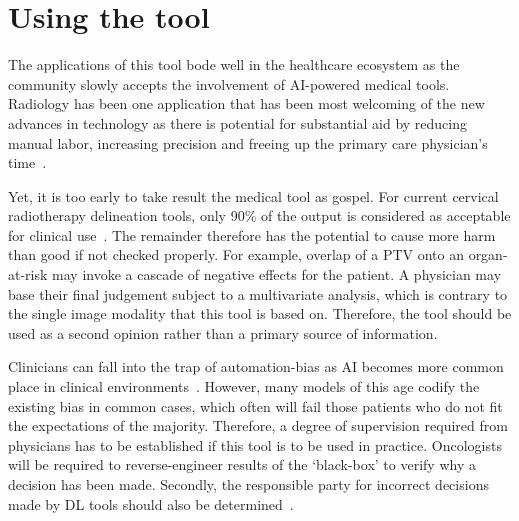 \documentclass[12pt,twoside]{report}
\begin{document}
\section{Using the tool}\label{sect:using-the-tool}

The applications of this tool bode well in the healthcare ecosystem as the community slowly accepts the involvement of AI-powered medical tools. Radiology has been one application that has been most welcoming of the new advances in technology as there is potential for substantial aid by reducing manual labor, increasing precision and freeing up the primary care physician's time~\cite{Amisha2019-ki}.

Yet, it is too early to take result the medical tool as gospel. For current cervical radiotherapy delineation tools, only 90\% of the output is considered as acceptable for clinical use~\cite{LIU2020172}. The remainder therefore has the potential to cause more harm than good if not checked properly. For example, overlap of a PTV onto an organ-at-risk may invoke a cascade of negative effects for the patient. A physician may base their final judgement subject to a multivariate analysis, which is contrary to the single image modality that this tool is based on. Therefore, the tool should be used as a second opinion rather than a primary source of information.

Clinicians can fall into the trap of automation-bias as AI becomes more common place in clinical environments~\cite{STRAW2020101965}. However, many models of this age codify the existing bias in common cases, which often will fail those patients who do not fit the expectations of the majority. Therefore, a degree of supervision required from physicians has to be established if this tool is to be used in practice. Oncologists will be required to reverse-engineer results of the `black-box' to verify why a decision has been made. Secondly, the responsible party for incorrect decisions made by DL tools should also be determined~\cite{Chen2021-dg}.



\end{document}
